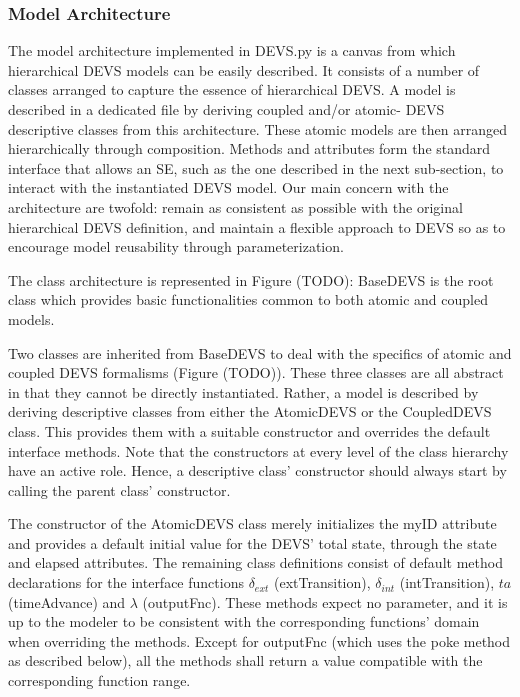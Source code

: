 \subsubsection{Model Architecture}
The model architecture implemented in DEVS.py is a canvas from which hierarchical DEVS models can be easily described. It consists 
of a number of classes arranged to capture the essence of hierarchical DEVS. A model is described in a dedicated file by deriving 
coupled and/or atomic- DEVS descriptive classes from this architecture. These atomic models are then arranged hierarchically through 
composition. Methods and attributes form the standard interface that allows an SE, such as the one described in the next sub-section, 
to interact with the instantiated DEVS model. Our main concern with the architecture are twofold: remain as consistent as possible 
with the original hierarchical DEVS definition, and maintain a flexible approach to DEVS so as to encourage model reusability 
through parameterization.

The class architecture is represented in Figure (TODO): BaseDEVS is the root class which provides basic functionalities common to both 
atomic and coupled models.

Two classes are inherited from BaseDEVS to deal with the specifics of atomic and coupled DEVS formalisms (Figure (TODO)). These three 
classes are all abstract in that they cannot be directly instantiated. Rather, a model is described by deriving descriptive classes 
from either the AtomicDEVS or the CoupledDEVS class. This provides them with a suitable constructor and overrides the default 
interface methods. Note that the constructors at every level of the class hierarchy have an active role. Hence, a descriptive class' 
constructor should always start by calling the parent class' constructor.

The constructor of the AtomicDEVS class merely initializes the myID attribute and provides a default initial value for the DEVS' 
total state, through the state and elapsed attributes. The remaining class definitions consist of default method declarations for 
the interface functions $\delta_{ext}$ (extTransition), $\delta_{int}$ (intTransition), $ta$ (timeAdvance) and $\lambda$ (outputFnc). 
These methods expect no parameter, and it is up to the modeler to be consistent with the corresponding functions' domain when overriding 
the methods. Except for outputFnc (which uses the poke method as described below), all the methods shall return a value compatible with 
the corresponding function range.

